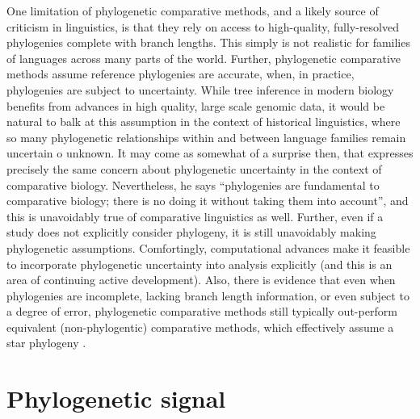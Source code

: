 One limitation of phylogenetic comparative methods, and a likely source of criticism in linguistics, is that they rely on access to high-quality, fully-resolved phylogenies complete with branch lengths. This simply is not realistic for families of languages across many parts of the world. Further, phylogenetic comparative methods assume reference phylogenies are accurate, when, in practice, phylogenies are subject to uncertainty. While tree inference in modern biology benefits from advances in high quality, large scale genomic data, it would be natural to balk at this assumption in the context of historical linguistics, where so many phylogenetic relationships within and between language families remain uncertain o unknown. It may come as somewhat of a surprise then, that \textcite[p.~14]{felsenstein_phylogenies_1985} expresses precisely the same concern about phylogenetic uncertainty in the context of comparative biology. Nevertheless, he says ``phylogenies are fundamental to comparative biology; there is no doing it without taking them into account'', and this is unavoidably true of comparative linguistics as well. Further, even if a study does not explicitly consider phylogeny, it is still unavoidably making phylogenetic assumptions. Comfortingly, computational advances make it feasible to incorporate phylogenetic uncertainty into analysis explicitly (and this is an area of continuing active development). Also, there is evidence that even when phylogenies are incomplete, lacking branch length information, or even subject to a degree of error, phylogenetic comparative methods still typically out-perform equivalent (non-phylogentic) comparative methods, which effectively assume a star phylogeny \autocites{grafen_phylogenetic_1989}{purvis_truth_1994}{symonds_effects_2002}.

\hypertarget{phylo-sig}{%
\section{Phylogenetic signal}\label{phylo-sig}}

